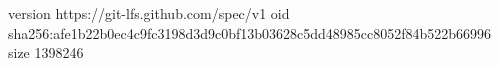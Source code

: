 version https://git-lfs.github.com/spec/v1
oid sha256:afe1b22b0ec4c9fc3198d3d9c0bf13b03628c5dd48985cc8052f84b522b66996
size 1398246
